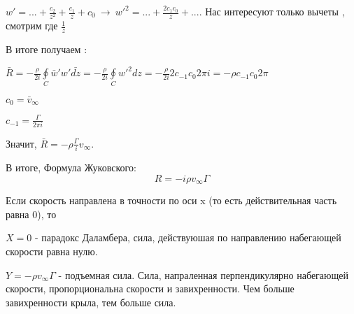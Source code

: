 $w' = ... + \frac{c_2}{z^2} + \frac{c_1}{z} + c_0 \ \rightarrow \ w'^2 = ... + \frac{2 c_1 c_0}{z} + ...$. Нас интересуют только вычеты , смотрим где $\frac{1}{z}$ 

В итоге получаем : 

$\bar{R} =  -\frac{\rho}{2 i} \oint \limits_{C} \bar{w}'  w'  \bar{d z} =  -\frac{\rho}{2 i} \oint \limits_{C} w'^2 dz = -\frac{\rho}{2 i} 2 c_{-1} c_0 2 \pi i = -\rho c_{-1} c_0 2 \pi$

$ c_0 = \bar{v}_{\infty}$

$c_{-1} = \frac{\Gamma}{2 \pi i} $

Значит, $\bar{R} = -\rho \frac{\Gamma}{i} v_{\infty} $.

В итоге, Формула Жуковского: $$R = -i \rho v_{\infty} \Gamma$$

Если скорость направлена в точности по оси x (то есть действительная часть равна 0), то 

$X = 0$ - парадокс Даламбера, сила, действуюшая по направлению набегающей скорости равна нулю.

$Y = -\rho v_{\infty} \Gamma $ - подъемная сила. Сила, напраленная перпендикулярно набегающей скорости, пропорциональна скорости и завихренности. Чем больше завихренности крыла, тем больше сила. 
